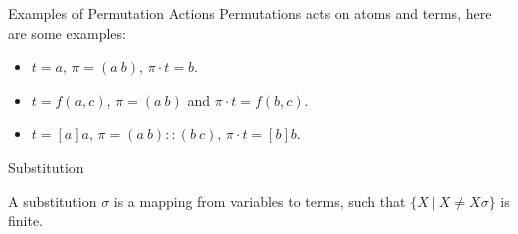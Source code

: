 
\begin{frame}{Examples of Permutation Actions}
    Permutations acts on atoms and terms, here are some examples: 
    \begin{itemize}
        \item $t = a$, $\pi = (a \ b)$, $\pi \cdot t = b$.
        \item $t = f(a, c)$, $\pi = (a \ b)$ and $\pi \cdot t = f(b, c)$.
        \item $t = [a]a$, $\pi = (a \ b)::(b \ c)$, $\pi \cdot t = [b]b$.
    \end{itemize}
\end{frame}

\begin{frame}{Substitution}
    \begin{definition}[Substitution]
    A substitution $\sigma$ is a mapping from variables to terms, such that
    $\{X \ | \ X \neq X\sigma \}$ is finite.
    \end{definition}
\end{frame}

%    

